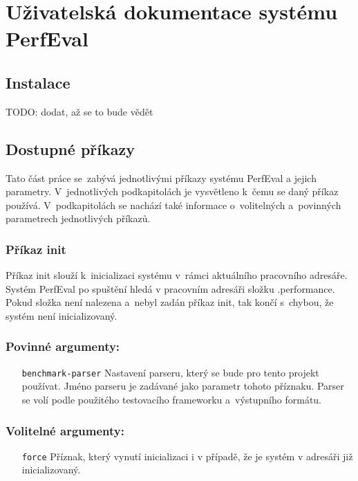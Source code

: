 \chapter{Uživatelská dokumentace systému PerfEval}

\section{Instalace}

TODO: dodat, až se to bude vědět

\section{Dostupné příkazy}

Tato část práce se~zabývá jednotlivými příkazy systému PerfEval a jejich parametry.
V~jednotlivých podkapitolách je vysvětleno k~čemu se daný příkaz používá. V~podkapitolách
se nachází také informace o~volitelných a~povinných parametrech jednotlivých příkazů.

\subsection{Příkaz init}

Příkaz init slouží k~inicializaci systému v~rámci aktuálního pracovního adresáře.
Systém PerfEval po spuštění hledá v pracovním adresáři složku .performance. Pokud složka
není nalezena a~nebyl zadán příkaz init, tak končí s~chybou, že systém není inicializovaný.

\subsection*{Povinné argumenty:}
\begin{itemize}[label=\texttt{\textbf{\textendash}}]
    \item[\texttt{benchmark-parser}] Nastavení parseru, který se bude pro tento projekt používat.
        Jméno parseru je zadávané jako parametr tohoto příznaku.
        Parser se volí podle použitého testovacího frameworku a~výstupního formátu.
\end{itemize}

\subsection*{Volitelné argumenty:}
\begin{itemize}[label=\texttt{\textbf{\textendash}}]
    \item[\texttt{force}] Příznak, který vynutí inicializaci i v případě, že je systém v adresáři již inicializovaný.
\end{itemize}

